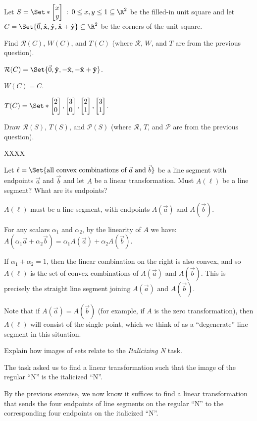 \documentclass{problemset}
\newcommand{\xhat}{{\hat {\mathbf x}}}
\newcommand{\yhat}{{\hat {\mathbf y}}}
\newcommand{\mat}[1]{\begin{bmatrix*}[r]#1\end{bmatrix*}}
\providecommand\given{}
\newcommand\SetSymbol[1][]{%
	\nonscript\::%
	\allowbreak
	\nonscript\:
	\mathopen{}}
\renewcommand\given{\SetSymbol[\delimsize]}
\begin{document}
	\question
	Let $S=\Set*{\mat{x\\y} \given 0\leq x,y\leq 1}\subseteq \R^2$ be the filled-in unit 
	square and let $C=\Set{\vec 0, \xhat,\yhat,\xhat+\yhat}\subseteq \R^2$
	be the corners of the unit square.
	\begin{parts}
		\item Find $\mathcal R(C)$, $W(C)$, and $T(C)$ (where $\mathcal R$, $W$,
			and $T$ are from the previous question).
			\begin{solution}
				$\mathcal R(C) = \Set{\vec 0,\yhat,-\xhat,-\xhat+\yhat}$.

				$W(C) = C$.

				$T(C) = \Set*{\mat{2\\0},\mat{3\\0},\mat{2\\1},\mat{3\\1}}$.
			\end{solution}
		\item Draw $\mathcal R(S)$, $T(S)$, and $\mathcal P(S)$ (where $\mathcal R$,
			$T$, and $\mathcal P$ are from the previous question).
			\begin{solution}
				XXXX
			\end{solution}
		\item Let $\ell=\Set{\text{all convex combinations of }\vec a\text{ and }\vec b}$
			be a line segment with endpoints $\vec a$ and $\vec b$ and let $A$ be
			a linear transformation. Must $A(\ell)$ be a line segment? 
			What are its endpoints?
			\begin{solution}
				$A(\ell)$ must be a line segment, with endpoints $A(\vec a)$ and
				$A(\vec b)$.

				For any scalars $\alpha_1$ and $\alpha_2$, by the linearity of $A$
				we have: $A(\alpha_1\vec a+\alpha_2\vec b)=\alpha_1A(\vec a)+\alpha_2A(\vec b)$.

				If $\alpha_1+\alpha_2=1$, then the linear combination on the right
				is also convex, and so $A(\ell)$ is the set of convex combinations 
				of $A(\vec a)$ and $A(\vec b)$. 
				This is precisely the straight line segment joining $A(\vec a)$
				and $A(\vec b)$.

				Note that if $A(\vec a)=A(\vec b)$ (for example, if $A$ is the
				zero transformation), then $A(\ell)$ will consist of the single
				point, which we think of as a ``degenerate'' line segment in this
				situation. 
			\end{solution}
		\item Explain how images of sets relate to the \emph{Italicizing N} task.
			\begin{solution}
				The task asked us to find a linear transformation such that the
				image of the regular ``N'' is the italicized ``N''. 

				By the previous exercise, we now know it suffices to find a 
				linear transformation that sends the four endpoints of line 
				segments on the regular ``N'' to the corresponding four endpoints
				on the italicized ``N''. 
			\end{solution}
	\end{parts}
\end{document}
